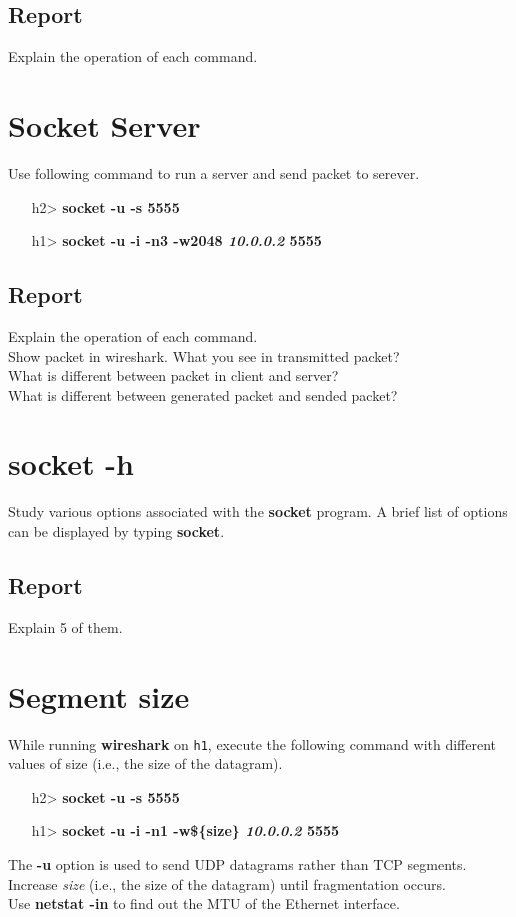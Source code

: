 \documentclass[10pt,a4paper]{article}
\numberwithin{equation}{section}
\numberwithin{figure}{section}
\numberwithin{table}{section}
\begin{document}
\subsection*{Report}
Explain the operation of each command.

\section{Socket Server}
Use following command to run a server and send packet to serever.
\begin{itemize}
	\item [h2>] \textbf{socket -u -s 5555}
	\item [h1>] \textbf{socket -u -i -n3 -w2048 \textit{10.0.0.2} 5555}
\end{itemize}

\subsection*{Report}
Explain the operation of each command.\\
Show packet in wireshark. What you see in transmitted packet?\\
What is different between packet in client and server?\\
What is different between generated packet and sended packet?

\section{socket -h}
Study various options associated with the \textbf{socket} program.
A brief list of options can be displayed by typing \textbf{socket}.
\subsection*{Report}
Explain 5 of them.

\section{Segment size}
While running \textbf{wireshark} on \texttt{h1}, execute the following command with different values of size (i.e., the size of the datagram). \\
\begin{itemize}
	\item [h2>] \textbf{socket -u -s 5555}
	\item [h1>] \textbf{socket -u -i -n1 -w\$\{size\} \textit{10.0.0.2} 5555}
\end{itemize}
The \textbf{-u} option is used to send UDP datagrams rather than TCP segments. \\
Increase \textit{size} (i.e., the size of the datagram) until fragmentation occurs. \\
Use \textbf{netstat -in} to find out the MTU of the Ethernet interface.
\end{document}
